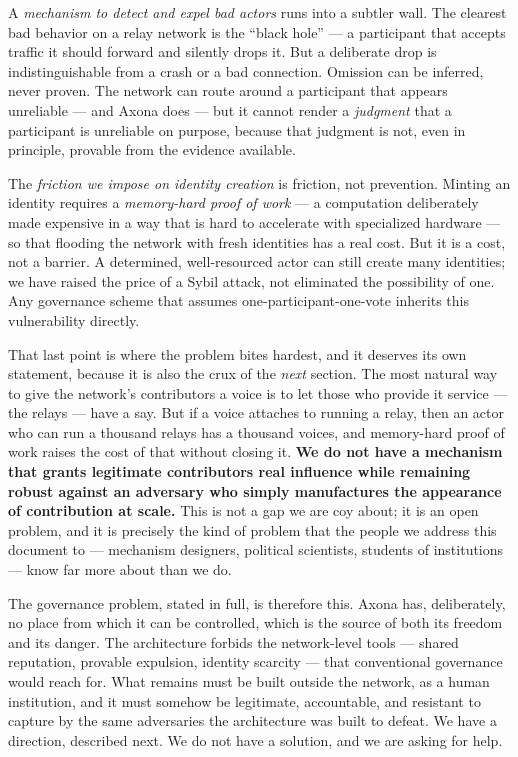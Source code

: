 \documentclass[nobib,justified]{tufte-handout}
\begin{document}
A \emph{mechanism to detect and expel bad actors} runs into a subtler wall. The
clearest bad behavior on a relay network is the ``black hole'' --- a participant
that accepts traffic it should forward and silently drops it. But a deliberate
drop is indistinguishable from a crash or a bad connection. Omission can be
inferred, never proven. The network can route around a participant that appears
unreliable --- and Axona does --- but it cannot render a \emph{judgment} that a
participant is unreliable on purpose, because that judgment is not, even in
principle, provable from the evidence available.

The \emph{friction we impose on identity creation} is friction, not prevention.
Minting an identity requires a \emph{memory-hard proof of work} --- a computation
deliberately made expensive in a way that is hard to accelerate with specialized
hardware --- so that flooding the network with fresh identities has a real cost.
But it is a cost, not a barrier. A determined, well-resourced actor can still
create many identities; we have raised the price of a Sybil attack, not
eliminated the possibility of one. Any governance scheme that assumes
one-participant-one-vote inherits this vulnerability directly.

That last point is where the problem bites hardest, and it deserves its own
statement, because it is also the crux of the \emph{next} section. The most
natural way to give the network's contributors a voice is to let those who provide
it service --- the relays --- have a say. But if a voice attaches to running a
relay, then an actor who can run a thousand relays has a thousand voices, and
memory-hard proof of work raises the cost of that without closing it.
\textbf{We do not have a mechanism that grants legitimate contributors real
influence while remaining robust against an adversary who simply manufactures the
appearance of contribution at scale.} This is not a gap we are coy about; it is an
open problem, and it is precisely the kind of problem that the people we address
this document to --- mechanism designers, political scientists, students of
institutions --- know far more about than we do.

The governance problem, stated in full, is therefore this. Axona has,
deliberately, no place from which it can be controlled, which is the source of
both its freedom and its danger. The architecture forbids the network-level tools
--- shared reputation, provable expulsion, identity scarcity --- that conventional
governance would reach for. What remains must be built outside the network, as a
human institution, and it must somehow be legitimate, accountable, and resistant
to capture by the same adversaries the architecture was built to defeat. We have a
direction, described next. We do not have a solution, and we are asking for help.
\end{document}
